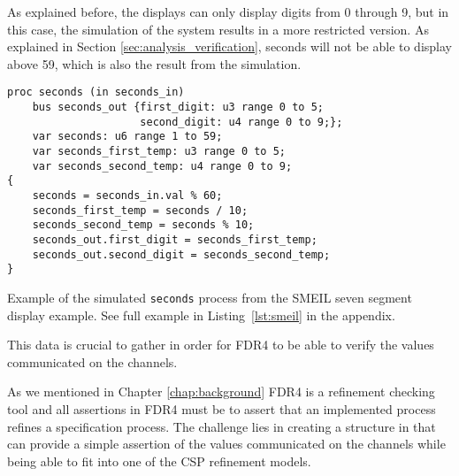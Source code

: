 As explained before, the displays can only display digits from 0 through 9, but in this case, the simulation of the system results in a more restricted version. As explained in Section \ref{sec:analysis_verification}, seconds will not be able to display above 59, which is also the result from the simulation.
\begin{listing}
\begin{verbatim}
proc seconds (in seconds_in)
    bus seconds_out {first_digit: u3 range 0 to 5;
                     second_digit: u4 range 0 to 9;};
    var seconds: u6 range 1 to 59;
    var seconds_first_temp: u3 range 0 to 5;
    var seconds_second_temp: u4 range 0 to 9;
{
    seconds = seconds_in.val % 60;
    seconds_first_temp = seconds / 10;
    seconds_second_temp = seconds % 10;
    seconds_out.first_digit = seconds_first_temp;
    seconds_out.second_digit = seconds_second_temp;
}
\end{verbatim}
\caption{Example of the simulated \texttt{seconds} process from the SMEIL seven segment display example. See full example in Listing~\ref{lst:smeil} in the appendix.}
\label{lst:range_smeil}
\end{listing}

This data is crucial to gather in order for FDR4 to be able to verify the values communicated on the channels.

As we mentioned in Chapter \ref{chap:background} FDR4 is a refinement checking tool and all assertions in FDR4 must be to assert that an implemented process refines a specification process.
The challenge lies in creating a structure in \cspm{} that can provide a simple assertion of the values communicated on the channels while being able to fit into one of the CSP refinement models.


